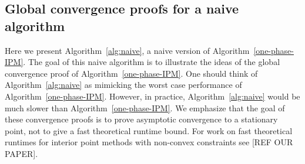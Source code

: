 \documentclass{article}
\begin{document}
\subsection{Global convergence proofs for a naive algorithm}\label{sec:theory-naive}

Here we present Algorithm~\ref{alg:naive}, a naive version of Algorithm~\ref{one-phase-IPM}. The goal of this naive algorithm is to illustrate the ideas of the global convergence proof of Algorithm~\ref{one-phase-IPM}. One should think of Algorithm~\ref{alg:naive} as mimicking the worst case performance of Algorithm~\ref{one-phase-IPM}. However, in practice, Algorithm~\ref{alg:naive} would be much slower than  Algorithm~\ref{one-phase-IPM}. We emphasize that the goal of these convergence proofs is to prove asymptotic convergence to a stationary point, not to give a fast theoretical runtime bound. For work on fast theoretical runtimes for interior point methods with non-convex constraints see [REF OUR PAPER]. 
\end{document}
